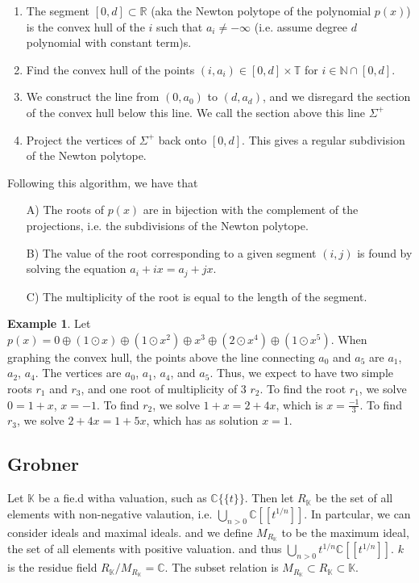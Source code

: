 \documentclass[12pt]{memoir}
\theoremstyle{definition}
\newtheorem{protoexample}{Example}[section]
\newenvironment{ex}
   {\begin{protoexample}}
   {\end{protoexample}}
\def\RR{{\mathbb R}}
\def\KK{{\mathbb K}}
\def\CC{{\mathbb C}}
\def\NN{{\mathbb N}}
\def\TT{{\mathbb T}}
\begin{document}
\begin{enumerate}
    \item The segment $[0,d]\subset \RR$ (aka the Newton polytope of the polynomial $p(x)$) is the convex hull of the $i$ such that $a_i \neq - \infty$ (i.e. assume degree $d$ polynomial with constant term)s.
    \item Find the convex hull of the points $(i,a_i)\in [0,d] \times \TT$ for $i \in \NN \cap [0,d]$.
    \item We construct the line from $(0,a_0)$ to $(d,a_d)$, and we disregard the section of the convex hull below this line. We call the section above this line $\Sigma^+$
    \item Project the vertices of $\Sigma^+$ back onto $[0,d]$. This gives a regular subdivision of the Newton polytope.
\end{enumerate}
Following this algorithm, we have that
\begin{itemize}
    \item [A)] The roots of $p(x)$ are in bijection with the complement of the projections, i.e. the subdivisions of the Newton polytope.
    \item [B)] The value of the root corresponding to a given segment $(i,j)$ is found by solving the equation $a_i + ix = a_j  +jx$.
    \item [C)] The multiplicity of the root is equal to the length of the segment.
\end{itemize}



\begin{ex}
    Let $p(x) = 0 \oplus (1 \odot x) \oplus (1\odot x^2) \oplus x^3 \oplus (2\odot x^4) \oplus (1 \odot x^5)$. When graphing the convex hull, the points above the line connecting $a_0$ and $a_5$ are $a_1$, $a_2$, $a_4$. The vertices are $a_0$, $a_1$, $a_4$, and $a_5$. Thus, we expect to have two simple roots $r_1$ and $r_3$, and one root of multiplicity of $3$ $r_2$. To find the root $r_1$, we solve $0=1+x$, $x=-1$. To find $r_2$, we solve $1+x = 2 + 4x$, which is $x=\frac{-1}{3}$. To find $r_3$, we solve $2 + 4x=1+5x$, which has as solution $x=1$.
\end{ex}





\subsection{Grobner}
Let $\KK$ be a fie.d witha  valuation, such as $\CC\{\{t\}\}$. Then let $R_\KK$ be the set of all elements with non-negative valaution, i.e. $\bigcup \limits_{n >0}\CC[[t^{1/n}]]$. In partcular, we can consider ideals and maximal ideals. and we define $M_{R_\KK}$ to be the maximum ideal, the set of all elements with positive valuation. and thus $\bigcup\limits_{n>0} t^{1/n}\CC[[t^{1/n}]]$. $k$ is the residue field $R_\KK/ M_{R_\KK} = \CC$. The subset relation is $M_{R_\KK} \subset R_\KK \subset \KK$.
\end{document}
